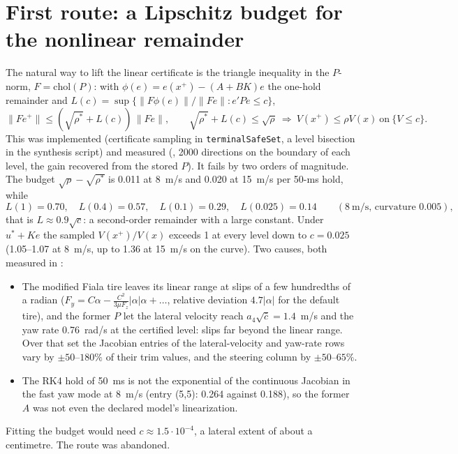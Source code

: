 \documentclass[11pt]{article}
\begin{document}
\section{First route: a Lipschitz budget for the nonlinear remainder}
The natural way to lift the linear certificate is the triangle inequality
in the $P$-norm, $F=\mathrm{chol}(P)$: with $\phi(e)=e(x^+)-(A+BK)e$ the
one-hold remainder and $L(c)=\sup\{\|F\phi(e)\|/\|Fe\| : e'Pe\le c\}$,
\[
\|Fe^+\|\le(\sqrt{\rho^*}+L(c))\,\|Fe\|,\qquad
\sqrt{\rho^*}+L(c)\le\sqrt{\rho}\ \Rightarrow\ V(x^+)\le\rho V(x)\ \text{on}\ \{V\le c\}.
\]
This was implemented (certificate sampling in \texttt{terminalSafeSet},
a level bisection in the synthesis script) and measured
(, 2000 directions on the boundary of each
level, the gain recovered from the stored $P$). It fails by two orders of
magnitude. The budget $\sqrt{\rho}-\sqrt{\rho^*}$ is 0.011 at 8~m/s and
0.020 at 15~m/s per 50-ms hold, while
\[
L(1)=0.70,\quad L(0.4)=0.57,\quad L(0.1)=0.29,\quad L(0.025)=0.14
\qquad(8~\text{m/s, curvature }0.005),
\]
that is $L\approx0.9\sqrt{c}$: a second-order remainder with a large
constant. Under $u^*+Ke$ the sampled $V(x^+)/V(x)$ exceeds 1 at every level
down to $c=0.025$ (1.05--1.07 at 8~m/s, up to 1.36 at 15~m/s on the curve).
Two causes, both measured in :
\begin{itemize}
\item The modified Fiala tire leaves its linear range at slips of a few
  hundredths of a radian ($F_y=C\alpha-\tfrac{C^2}{3\mu F_z}|\alpha|\alpha+\dots$,
  relative deviation $4.7|\alpha|$ for the default tire), and the former $P$
  let the lateral velocity reach $a_4\sqrt{\bar c}=1.4$~m/s and the yaw rate
  0.76~rad/s at the certified level: slips far beyond the linear range.
  Over that set the Jacobian entries of the lateral-velocity and yaw-rate
  rows vary by $\pm50$--$180\%$ of their trim values, and the steering column
  by $\pm50$--$65\%$.
\item The RK4 hold of 50~ms is not the exponential of the continuous
  Jacobian in the fast yaw mode at 8~m/s (entry (5,5): 0.264 against 0.188),
  so the former $A$ was not even the declared model's linearization.
\end{itemize}
Fitting the budget would need $c\approx1.5\cdot10^{-4}$, a lateral extent of
about a centimetre. The route was abandoned.
\end{document}
